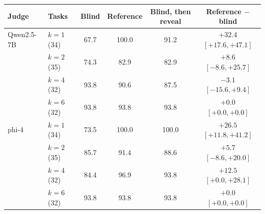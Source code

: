 \begin{tabular}{llcccc}
\toprule
Judge & Tasks & Blind & Reference & Blind, then reveal & Reference $-$ blind \\
\midrule
Qwen2.5-7B & $k{=}1$ (34) & 67.7 & 100.0 & 91.2 & $+32.4$ {\scriptsize$[+17.6,+47.1]$} \\
 & $k{=}2$ (35) & 74.3 & 82.9 & 82.9 & $+8.6$ {\scriptsize$[-8.6,+25.7]$} \\
 & $k{=}4$ (32) & 93.8 & 90.6 & 87.5 & $-3.1$ {\scriptsize$[-15.6,+9.4]$} \\
 & $k{=}6$ (32) & 93.8 & 93.8 & 93.8 & $+0.0$ {\scriptsize$[+0.0,+0.0]$} \\
\addlinespace
phi-4 & $k{=}1$ (34) & 73.5 & 100.0 & 100.0 & $+26.5$ {\scriptsize$[+11.8,+41.2]$} \\
 & $k{=}2$ (35) & 85.7 & 91.4 & 88.6 & $+5.7$ {\scriptsize$[-8.6,+20.0]$} \\
 & $k{=}4$ (32) & 84.4 & 96.9 & 93.8 & $+12.5$ {\scriptsize$[+0.0,+28.1]$} \\
 & $k{=}6$ (32) & 93.8 & 93.8 & 93.8 & $+0.0$ {\scriptsize$[+0.0,+0.0]$} \\
\bottomrule
\end{tabular}
